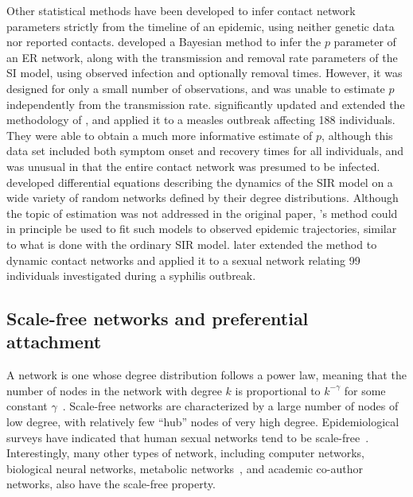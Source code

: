 Other statistical methods have been developed to infer contact network
parameters strictly from the timeline of an epidemic, using neither genetic
data nor reported contacts. \textcite{britton2002bayesian} developed a Bayesian
method to infer the $p$ parameter of an \gls{ER} network, along with the
transmission and removal rate parameters of the \gls{SI} model, using observed
infection and optionally removal times. However, it was designed for only a
small number of observations, and was unable to estimate $p$ independently from
the transmission rate.  \textcite{groendyke2011bayesian} significantly updated
and extended the methodology of \citeauthor{britton2002bayesian}, and applied
it to a measles outbreak affecting 188 individuals. They were able to obtain a
much more informative estimate of $p$, although this data set included both
symptom onset and recovery times for all individuals, and was unusual in that
the entire contact network was presumed to be infected. \textcite{volz2008sir}
developed differential equations describing the dynamics of the \gls{SIR} model
on a wide variety of random networks defined by their degree distributions.
Although the topic of estimation was not addressed in the original paper,
\citeauthor{volz2008sir}'s method could in principle be used to fit such models
to observed epidemic trajectories, similar to what is done with the ordinary
\gls{SIR} model. \textcite{volz2007susceptible} later extended the method to
dynamic contact networks and applied it to a sexual network relating 99
individuals investigated during a syphilis outbreak.

\subsection{Scale-free networks and preferential attachment}
\label{subsec:pa}

A  network is one whose degree distribution follows a power
law, meaning that the number of nodes in the network with degree $k$ is
proportional to $k^{-\gamma}$ for some constant
$\gamma$~\autocite{barabasi1999emergence}. Scale-free networks are
characterized by a large number of nodes of low degree, with relatively few
``hub'' nodes of very high degree. Epidemiological surveys have indicated that
human sexual networks tend to be scale-free~\autocite{liljeros2001web,
schneeberger2004scale, colgate1989risk}. Interestingly, many other types of
network, including computer networks, biological neural networks, metabolic
networks~\autocite{jeong2000large}, and academic co-author networks, also have
the scale-free property.

